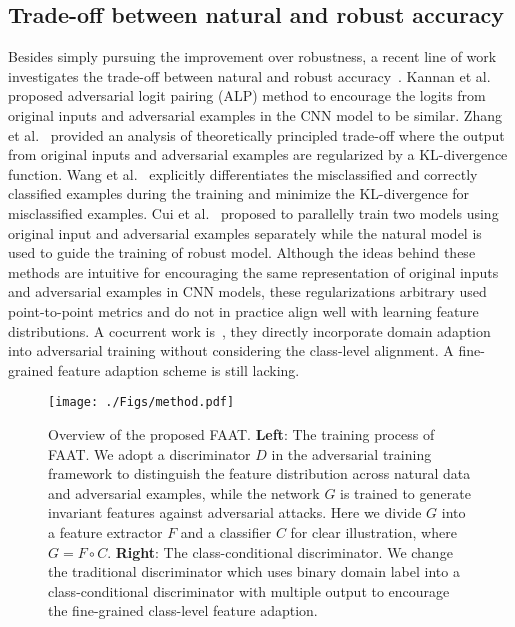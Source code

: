 \documentclass[10pt,twocolumn,letterpaper]{article}
\begin{document}
\subsection{Trade-off between natural and robust accuracy}
Besides simply pursuing the improvement over robustness, a recent line of work investigates the trade-off between natural and robust accuracy~\cite{58kannan2018adversarial,Zhang2019tradeoff,cui2020learnable,wang2021adaptive,Wang2020tradeoff,wu2020adversarial,Wang2021FA}. Kannan et al.~\cite{58kannan2018adversarial} proposed adversarial logit pairing (ALP) method to encourage the logits from original inputs and adversarial examples in the CNN model to be similar. Zhang et al.~\cite{Zhang2019tradeoff} provided an analysis of theoretically principled trade-off where the output from original inputs and adversarial examples are regularized by a KL-divergence function. Wang et al.~\cite{Wang2020Improving} explicitly differentiates the misclassified and correctly classified examples during the training and minimize the KL-divergence for misclassified examples. Cui et al.~\cite{cui2020learnable} proposed to parallelly train two models using original input and adversarial examples separately while the natural model is used to guide the training of robust model. Although the ideas behind these methods are intuitive for encouraging the same representation of original inputs and adversarial examples in CNN models, these regularizations arbitrary used point-to-point metrics and do not in practice align well with learning feature distributions. A cocurrent work is~\cite{levi2021domain}, they directly incorporate domain adaption into adversarial training without considering the class-level alignment. A fine-grained feature adaption scheme is still lacking.

\begin{figure*}[!t]
\centering
\texttt{[image: ./Figs/method.pdf]}
    \caption{Overview of the proposed FAAT. \textbf{Left}: The training process of FAAT. We adopt a discriminator $D$ in the adversarial training framework to distinguish the feature distribution across natural data and adversarial examples, while the network $G$ is trained to generate invariant features against adversarial attacks. Here we divide $G$ into a feature extractor $F$ and a classifier $C$ for clear illustration, where $G=F \circ C$. \textbf{Right}: The class-conditional discriminator. We change the traditional discriminator which uses binary domain label into a class-conditional discriminator with multiple output to encourage the fine-grained class-level feature adaption.}
    \vspace{-15pt}
\label{fig:method}
\end{figure*}
\end{document}

